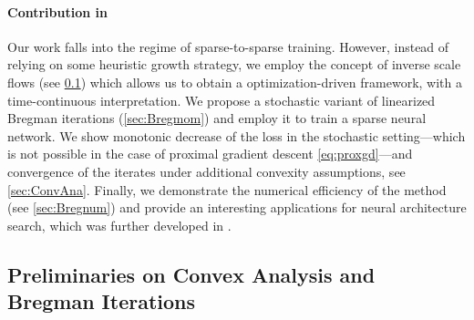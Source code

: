 \paragraph{Contribution in \cite{bungert2022bregman}}
%
Our work falls into the regime of sparse-to-sparse training. However, instead of relying on some heuristic growth strategy, we employ the concept of inverse scale flows (see \cref{sec:convprelim}) which allows us to obtain a optimization-driven framework, with a time-continuous interpretation. We propose a stochastic variant of linearized Bregman iterations (\cref{sec:Bregmom}) and employ it to train a sparse neural network. We show monotonic decrease of the loss in the stochastic setting---which is not possible in the case of proximal gradient descent \cref{eq:proxgd}---and convergence of the iterates under additional convexity assumptions, see \cref{sec:ConvAna}. Finally, we demonstrate the numerical efficiency of the method (see \cref{sec:Bregnum}) and provide an interesting applications for neural architecture search, which was further developed in \cite{bungert2021neural}.


\subsection{Preliminaries on Convex Analysis and Bregman Iterations}\label{sec:convprelim}

